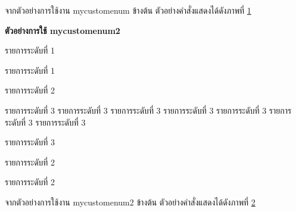 \newpage
\hspace*{1.5em} %
จากตัวอย่างการใช้งาน mycustomenum ข้างต้น ตัวอย่างคำสั่งแสดงได้ดังภาพที่ \ref{fig3:ExampleCreateEnum} 

\begin{figure}[htbp]
\centering
{}
\caption{}
\label{fig3:ExampleCreateEnum}
\end{figure}



\hspace*{1.5em} %
\textbf{ตัวอย่างการใช้ \textbf{mycustomenum2}}
\begin{mycustomenum2}
    \item รายการระดับที่ 1
    \item รายการระดับที่ 1
    \begin{mycustomenum2}
        \item รายการระดับที่ 2
        \begin{mycustomenum2}
            \item รายการระดับที่ 3 รายการระดับที่ 3 รายการระดับที่ 3 รายการระดับที่ 3 รายการระดับที่ 3 รายการระดับที่ 3 รายการระดับที่ 3 
            \item รายการระดับที่ 3
        \end{mycustomenum2}
        \item รายการระดับที่ 2
        \item รายการระดับที่ 2
    \end{mycustomenum2}
\end{mycustomenum2}

\hspace*{1.5em} %
จากตัวอย่างการใช้งาน mycustomenum2 ข้างต้น ตัวอย่างคำสั่งแสดงได้ดังภาพที่ \ref{fig3:ExampleCreateEnum2} 

\begin{figure}[htbp]
\centering
{}
\caption{}
\label{fig3:ExampleCreateEnum2}
\end{figure}


